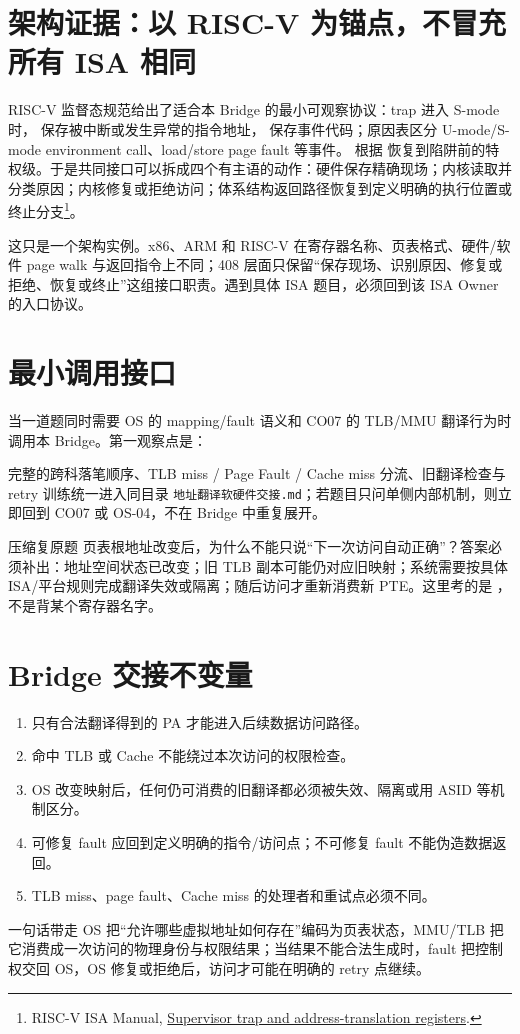 \documentclass[UTF8,fontset=none,11pt,a4paper]{ctexart}
\begin{document}
\section{架构证据：以 RISC-V 为锚点，不冒充所有 ISA 相同}
RISC-V 监督态规范给出了适合本 Bridge 的最小可观察协议：trap 进入 S-mode 时， 保存被中断或发生异常的指令地址， 保存事件代码；原因表区分 U-mode/S-mode environment call、load/store page fault 等事件。 根据  恢复到陷阱前的特权级。于是共同接口可以拆成四个有主语的动作：硬件保存精确现场；内核读取并分类原因；内核修复或拒绝访问；体系结构返回路径恢复到定义明确的执行位置或终止分支\footnote{RISC-V ISA Manual, \href{https://github.com/riscv/riscv-isa-manual/blob/main/src/priv/supervisor.adoc}{Supervisor trap and address-translation registers}.}。

这只是一个架构实例。x86、ARM 和 RISC-V 在寄存器名称、页表格式、硬件/软件 page walk 与返回指令上不同；408 层面只保留“保存现场、识别原因、修复或拒绝、恢复或终止”这组接口职责。遇到具体 ISA 题目，必须回到该 ISA Owner 的入口协议。

\section{最小调用接口}

当一道题同时需要 OS 的 mapping/fault 语义和 CO07 的 TLB/MMU 翻译行为时调用本 Bridge。第一观察点是：

完整的跨科落笔顺序、TLB miss / Page Fault / Cache miss 分流、旧翻译检查与 retry 训练统一进入同目录 \texttt{地址翻译软硬件交接.md}；若题目只问单侧内部机制，则立即回到 CO07 或 OS-04，不在 Bridge 中重复展开。

\begin{examplebox}{压缩复原题}
页表根地址改变后，为什么不能只说“下一次访问自动正确”？答案必须补出：地址空间状态已改变；旧 TLB 副本可能仍对应旧映射；系统需要按具体 ISA/平台规则完成翻译失效或隔离；随后访问才重新消费新 PTE。这里考的是 ，不是背某个寄存器名字。
\end{examplebox}

\section{Bridge 交接不变量}
\begin{enumerate}
\item {}只有合法翻译得到的 PA 才能进入后续数据访问路径。
\item {}命中 TLB 或 Cache 不能绕过本次访问的权限检查。
\item {}OS 改变映射后，任何仍可消费的旧翻译都必须被失效、隔离或用 ASID 等机制区分。
\item {}可修复 fault 应回到定义明确的指令/访问点；不可修复 fault 不能伪造数据返回。
\item {}TLB miss、page fault、Cache miss 的处理者和重试点必须不同。
\end{enumerate}

\begin{corebox}{一句话带走}
OS 把“允许哪些虚拟地址如何存在”编码为页表状态，MMU/TLB 把它消费成一次访问的物理身份与权限结果；当结果不能合法生成时，fault 把控制权交回 OS，OS 修复或拒绝后，访问才可能在明确的 retry 点继续。
\end{corebox}
\end{document}
